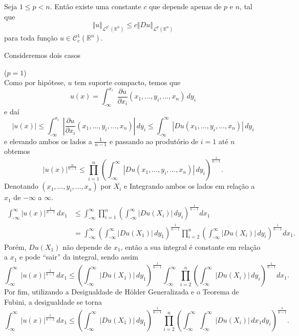 \documentclass[a4paper, 11pt]{book}
\theoremstyle{definition}
\newcommand{\m}{\text{-}}
\newcommand{\bR}{\mathbb{R}}
\newcommand{\cC}{\mathcal{C}}
\newcommand{\cL}{\mathcal{L}}
\begin{document}
\begin{tbox} Seja $1 \leqslant p < n$. Então existe uma constante $c$ que depende apenas de $p$ e $n$, tal que
\begin{equation}
    \Vert u \Vert_{\cL^{p^*}(\bR^n)} \leqslant c \Vert Du \Vert_{\cL^p(\bR^n)}
\end{equation}
para toda função $u \in \cC^1_c(\bR^n)$.
\end{tbox}
\begin{prf}
    Consideremos dois casos

    ($p = 1$)\\
    Como por hipótese, $u$ tem suporte compacto, temos que
    \[
        u(x) = \int_{\m\infty}^{x_i} \dfrac{\partial u}{\partial x_i}(x_1,\dots,y_i,\dots,x_n) \, dy_i
    \]
    e daí
    \[
        |u(x)| \leqslant \int_{\m\infty}^{x_i} \left|\dfrac{\partial u}{\partial x_i}(x_1,\dots,y_i,\dots,x_n)\right| \, dy_i  \leqslant \int_{\m\infty}^{\infty} \left| Du(x_1,\dots,y_i,\dots,x_n) \right| \,dy_i
    \]
    e elevando ambos os lados a $\frac{1}{n-1}$ e passando ao produtório de $i = 1$ até $n$ obtemos
    \[
        |u(x)|^{\frac{n}{n-1}} \leqslant \prod_{i=1}^n \left( \int_{\m\infty}^{\infty} |Du(x_1,\dots,y_i,\dots,x_n)| \,dy_i \right)^{\frac{1}{n-1}}.
    \]
    Denotando $(x_1,\dots,y_i,\dots,x_n)$ por $X_i$ e  Integrando ambos os lados em relação a $x_1$ de $-\infty$ a $\infty$.
    \[
        \begin{aligned}
            \int_{\m\infty}^{\infty} |u(x)|^{\frac{1}{n-1}} \,dx_1 &\leqslant \int_{\m\infty}^{\infty} \prod_{i=1}^n \left( \int_{\m\infty}^{\infty} |Du(X_i)| \,dy_i \right)^{\frac{1}{n-1}}  dx_1\\ 
            &= \int_{\m\infty}^{\infty} \left( \int_{\m\infty}^{\infty} |Du(X_1)| \,dy_1 \right)^{\frac{1}{n-1}}  \prod_{i=2}^n \left(\int_{\m\infty}^{\infty} |Du(X_i)| \, dy_i\right)^{\frac{1}{n-1}} dx_1.
        \end{aligned}
    \]
    Porém, $Du(X_1)$ não depende de $x_1$, então a sua integral é constante em relação a $x_1$ e pode ``sair'' da integral, sendo assim
    \[
        \int_{\m\infty}^{\infty} |u(x)|^{\frac{1}{n-1}} \,dx_1 \leqslant \left( \int_{\m\infty}^{\infty} |Du(X_1)| \,dy_1 \right)^{\frac{1}{n-1}}\int_{\m\infty}^{\infty}   \prod_{i=2}^n \left(\int_{\m\infty}^{\infty} |Du(X_i)| \, dy_i\right)^{\frac{1}{n-1}} dx_1.
    \]
    Por fim, utilizando a Desigualdade de Hölder Generalizada e o Teorema de Fubini, a desigualdade se torna
    \[
        \int_{\m\infty}^{\infty} |u(x)|^{\frac{1}{n-1}} \,dx_1 \leqslant \left( \int_{\m\infty}^{\infty} |Du(X_1)| \,dy_1 \right)^{\frac{1}{n-1}}\prod_{i=2}^n \left(\int_{\m\infty}^{\infty}   \int_{\m\infty}^{\infty} |Du(X_i)| \, dx_1dy_i\right)^{\frac{1}{n-1}}.
\]
\end{prf}
\end{document}
